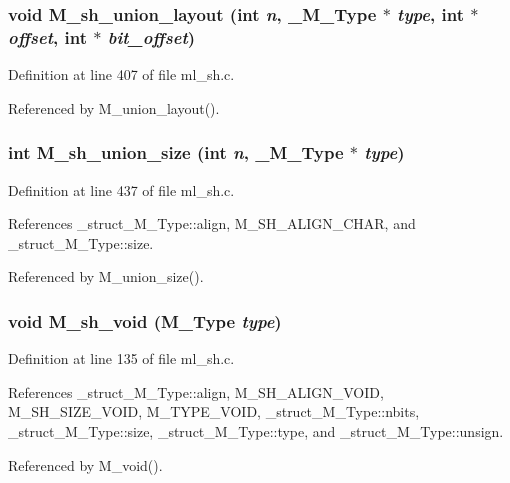 \subsubsection{\setlength{\rightskip}{0pt plus 5cm}void M\_\-sh\_\-union\_\-layout (int {\em n}, \bf{\_\-M\_\-Type} $\ast$ {\em type}, int $\ast$ {\em offset}, int $\ast$ {\em bit\_\-offset})}\label{ml__sh_8c_fb401d4a3045cb87e02bbe2f7f50f928}




Definition at line 407 of file ml\_\-sh.c.

Referenced by M\_\-union\_\-layout().
\subsubsection{\setlength{\rightskip}{0pt plus 5cm}int M\_\-sh\_\-union\_\-size (int {\em n}, \bf{\_\-M\_\-Type} $\ast$ {\em type})}\label{ml__sh_8c_00a63818df8d75dd91dab35d3507ef13}




Definition at line 437 of file ml\_\-sh.c.

References \_\-struct\_\-M\_\-Type::align, M\_\-SH\_\-ALIGN\_\-CHAR, and \_\-struct\_\-M\_\-Type::size.

Referenced by M\_\-union\_\-size().
\subsubsection{\setlength{\rightskip}{0pt plus 5cm}void M\_\-sh\_\-void (\bf{M\_\-Type} {\em type})}\label{ml__sh_8c_5ac022b280bb8009d4c3744963b6951b}




Definition at line 135 of file ml\_\-sh.c.

References \_\-struct\_\-M\_\-Type::align, M\_\-SH\_\-ALIGN\_\-VOID, M\_\-SH\_\-SIZE\_\-VOID, M\_\-TYPE\_\-VOID, \_\-struct\_\-M\_\-Type::nbits, \_\-struct\_\-M\_\-Type::size, \_\-struct\_\-M\_\-Type::type, and \_\-struct\_\-M\_\-Type::unsign.

Referenced by M\_\-void().